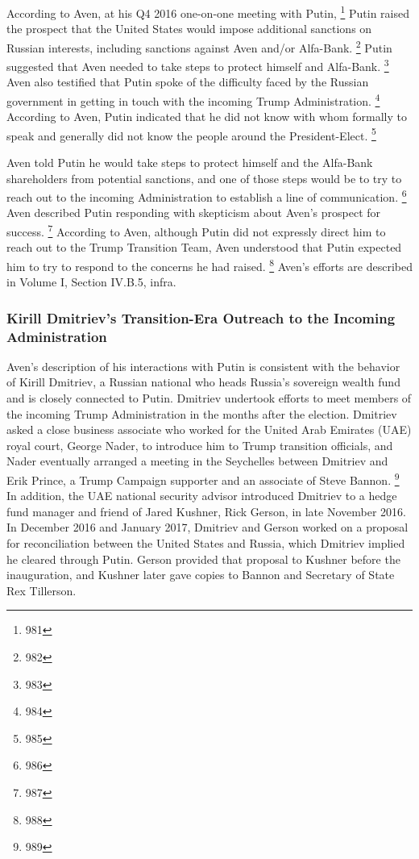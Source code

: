 According to Aven, at his Q4 2016 one-on-one meeting with Putin,%
\footnote{981}
Putin raised the prospect that the United States would impose additional sanctions on Russian interests, including sanctions against Aven and/or Alfa-Bank.%
\footnote{982}
Putin suggested that Aven needed to take steps to protect himself and Alfa-Bank.%
\footnote{983}
Aven also testified that Putin spoke of the difficulty faced by the Russian government in getting in touch with the incoming Trump Administration.%
\footnote{984}
According to Aven, Putin indicated that he did not know with whom formally to speak and generally did not know the people around the President-Elect.%
\footnote{985}

Aven
told Putin he would take steps to protect himself and the Alfa-Bank shareholders from potential sanctions, and one of those steps would be to try to reach out to the incoming Administration to establish a line of communication.%
\footnote{986}
Aven described Putin responding with skepticism about Aven's prospect for success.%
\footnote{987}
According to Aven, although Putin did not expressly direct him to reach out to the Trump Transition Team, Aven understood that Putin expected him to try to respond to the concerns he had raised.%
\footnote{988}
Aven's efforts are described in Volume I, Section IV.B.5, infra.

\subsubsection{Kirill Dmitriev's Transition-Era Outreach to the Incoming Administration}

Aven's description of his interactions with Putin is consistent with the behavior of Kirill Dmitriev, a Russian national who heads Russia's sovereign wealth fund and is closely connected to Putin.
Dmitriev undertook efforts to meet members of the incoming Trump Administration in the months after the election.
Dmitriev asked a close business associate who worked for the United Arab Emirates (UAE) royal court, George Nader, to introduce him to Trump transition officials, and Nader eventually arranged a meeting in the Seychelles between Dmitriev and Erik Prince, a Trump Campaign supporter and an associate of Steve Bannon.%
\footnote{989}
In addition, the UAE national security advisor introduced Dmitriev to a hedge fund manager and friend of Jared Kushner, Rick Gerson, in late November 2016.
In December 2016 and January 2017, Dmitriev and Gerson worked on a proposal for reconciliation between the United States and Russia, which Dmitriev implied he cleared through Putin.
Gerson provided that proposal to Kushner before the inauguration, and Kushner later gave copies to Bannon and Secretary of State Rex Tillerson.


